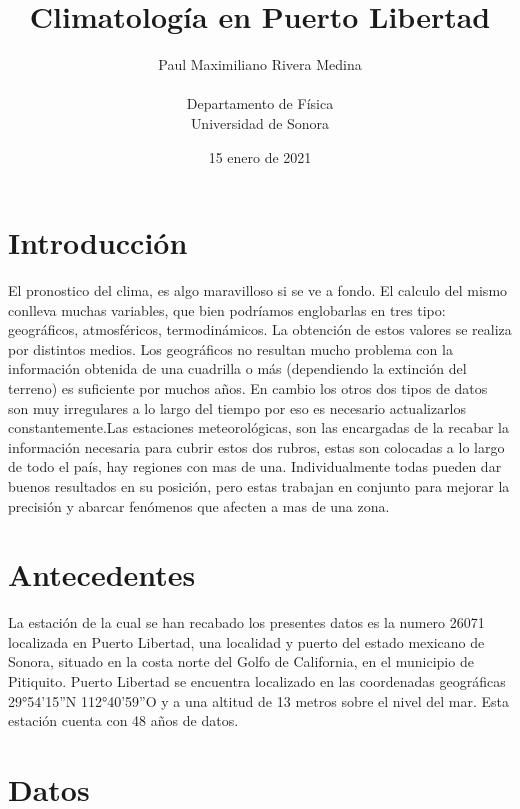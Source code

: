 \documentclass{report}
\title{Climatología en Puerto Libertad} %
\author{Paul Maximiliano Rivera Medina\\
    \\
    Departamento de Física \\
    Universidad de Sonora}
\date{15 enero de 2021}
\begin{document}
\maketitle

\section{Introducción}
El pronostico del clima, es algo maravilloso si se ve a fondo. El calculo del mismo conlleva muchas variables, que bien podríamos englobarlas en tres tipo: geográficos, atmosféricos, termodinámicos. La obtención de estos valores se realiza por distintos medios. Los geográficos no resultan mucho problema con la información obtenida de una cuadrilla o más (dependiendo la extinción del terreno) es suficiente por muchos años. En cambio los otros dos tipos de datos son muy irregulares a lo largo del tiempo por eso es necesario actualizarlos constantemente.Las estaciones meteorológicas, son las encargadas de la recabar la información necesaria para cubrir estos dos rubros, estas son colocadas a lo largo de todo el país, hay regiones con mas de una. Individualmente todas pueden dar buenos resultados en su posición, pero estas trabajan en conjunto para mejorar la precisión y abarcar fenómenos que afecten a mas de una zona.

\section{Antecedentes}
La estación de la cual se han recabado los presentes datos es la numero 26071 localizada en Puerto Libertad, una localidad y puerto del estado mexicano de Sonora, situado en la costa norte del Golfo de California, en el municipio de Pitiquito. Puerto Libertad se encuentra localizado en las coordenadas geográficas 29°54'15''N 112°40'59''O y a una altitud de 13 metros sobre el nivel del mar. Esta estación cuenta con 48 años de datos.

\section{Datos}
\end{document}
